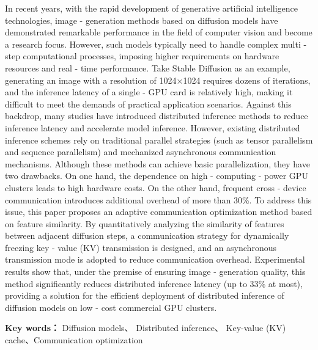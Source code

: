 \par
In recent years, with the rapid development of generative artificial intelligence technologies, 
image - generation methods based on diffusion models have demonstrated remarkable performance 
in the field of computer vision and become a research focus. However, such models typically 
need to handle complex multi - step computational processes, imposing higher requirements 
on hardware resources and real - time performance. Take Stable Diffusion as an example, 
generating an image with a resolution of 1024×1024 requires dozens of iterations, and the 
inference latency of a single - GPU card is relatively high, making it difficult to meet the 
demands of practical application scenarios. Against this backdrop, many studies have introduced 
distributed inference methods to reduce inference latency and accelerate model inference.
However, existing distributed inference schemes rely on traditional parallel strategies (such 
as tensor parallelism and sequence parallelism) and mechanized asynchronous communication 
mechanisms. Although these methods can achieve basic parallelization, they have two drawbacks. 
On one hand, the dependence on high - computing - power GPU clusters leads to high hardware 
costs. On the other hand, frequent cross - device communication introduces additional overhead 
of more than 30\%.
To address this issue, this paper proposes an adaptive communication optimization method based 
on feature similarity. By quantitatively analyzing the similarity of features between adjacent 
diffusion steps, a communication strategy for dynamically freezing key - value (KV) transmission 
is designed, and an asynchronous transmission mode is adopted to reduce communication overhead. 
Experimental results show that, under the premise of ensuring image - generation quality, 
this method significantly reduces distributed inference latency (up to 33\% at most), providing
 a solution for the efficient deployment of distributed inference of diffusion models on 
 low - cost commercial GPU clusters.



\noindent \textbf{Key words：} Diffusion models、 Distributed inference、 
Key-value (KV) cache、Communication optimization
